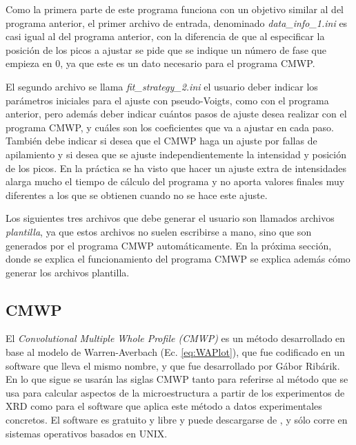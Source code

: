 Como la primera parte de este programa funciona con un objetivo similar al del programa anterior, el primer archivo de entrada, denominado \textit{data\_info\_1.ini} es casi igual al del programa anterior, con la diferencia de que al especificar la posición de los picos a ajustar se pide que se indique un número de fase que empieza en 0, ya que este es un dato necesario para el programa CMWP.

El segundo archivo se llama \textit{fit\_strategy\_2.ini} el usuario deber indicar los parámetros iniciales para el ajuste con pseudo-Voigts, como con el programa anterior, pero además deber indicar cuántos pasos de ajuste desea realizar con el programa CMWP, y cuáles son los coeficientes que va a ajustar en cada paso.
También debe indicar si desea que el CMWP haga un ajuste por fallas de apilamiento  y si desea que se ajuste independientemente la intensidad y posición de los picos.
En la práctica se ha visto que hacer un ajuste extra de intensidades alarga mucho el tiempo de cálculo del programa y no aporta valores finales muy diferentes a los que se obtienen cuando no se hace este ajuste.

Los siguientes tres archivos que debe generar el usuario son llamados archivos \textit{plantilla}, ya que estos archivos no suelen escribirse a mano, sino que son generados por el programa CMWP automáticamente.
En la próxima sección, donde se explica el funcionamiento del programa CMWP se explica además cómo generar los archivos plantilla.


\subsection{CMWP}\label{SS:CMWP}
El \textit{Convolutional Multiple Whole Profile (CMWP)} es un método desarrollado en base al modelo de Warren-Averbach (Ec. \ref{eq:WAPlot}), que fue codificado en un software que lleva el mismo nombre, y que fue desarrollado por Gábor Ribárik\cite{Ungar2001,Ribarik2001,Ribarik2008}. 
En lo que sigue se usarán las siglas CMWP tanto para referirse al método que se usa para calcular aspectos de la microestructura a partir de los experimentos de XRD como para el software que aplica este método a datos experimentales concretos.
El software es gratuito y libre y puede descargarse de \cite{cmwp:web}, y sólo corre en sistemas operativos basados en UNIX.

